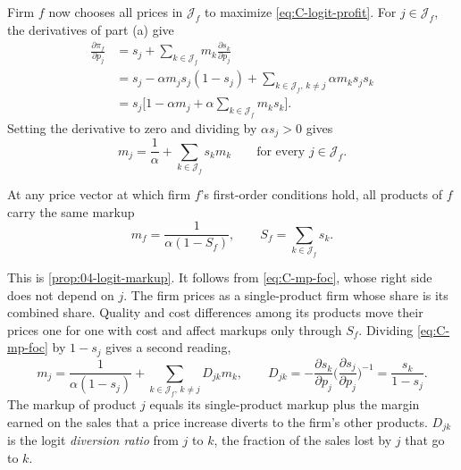 Firm $f$ now chooses all prices in $\mathcal{J}_f$ to maximize \eqref{eq:C-logit-profit}. For $j \in \mathcal{J}_f$, the
derivatives of part (a) give
\begin{align*}
  \frac{\partial\pi_f}{\partial p_j}
  &= s_j + \sum_{k \in \mathcal{J}_f}m_k\frac{\partial s_k}{\partial p_j} \\
  &= s_j - \alpha m_js_j(1 - s_j) + \sum_{k \in \mathcal{J}_f,\, k \ne j}\alpha m_ks_js_k \\
  &= s_j\Big[1 - \alpha m_j + \alpha\sum_{k \in \mathcal{J}_f}m_ks_k\Big] .
\end{align*}
Setting the derivative to zero and dividing by $\alpha s_j > 0$ gives
\begin{equation}\label{eq:C-mp-foc}
  m_j = \frac{1}{\alpha} + \sum_{k \in \mathcal{J}_f}s_km_k \qquad \text{for every } j \in \mathcal{J}_f .
\end{equation}

\begin{proposition}\label{prop:C-common-markup}
At any price vector at which firm $f$'s first-order conditions hold, all products of $f$ carry the same markup
\begin{equation}\label{eq:C-common-markup}
  m_f = \frac{1}{\alpha(1 - S_f)} , \qquad S_f = \sum_{k \in \mathcal{J}_f}s_k .
\end{equation}
\end{proposition}

This is \cref{prop:04-logit-markup}. It follows from \eqref{eq:C-mp-foc}, whose right side does not depend on $j$. The
firm prices as a single-product firm whose share is its combined share.
Quality and cost differences among its products move their prices one for one with cost and affect markups only
through $S_f$. Dividing \eqref{eq:C-mp-foc} by $1 - s_j$ gives a second reading,
\begin{equation}\label{eq:C-mp-foc-diversion}
  m_j = \frac{1}{\alpha(1 - s_j)} + \sum_{k \in \mathcal{J}_f,\, k \ne j}D_{jk}m_k ,
  \qquad D_{jk} = -\frac{\partial s_k}{\partial p_j}\Big(\frac{\partial s_j}{\partial p_j}\Big)^{-1} = \frac{s_k}{1 - s_j} .
\end{equation}
The markup of product $j$ equals its single-product markup plus the margin earned on the sales that a price increase
diverts to the firm's other products. $D_{jk}$ is the logit \emph{diversion ratio} from $j$ to $k$, the fraction of the sales lost by $j$ that go to $k$.

